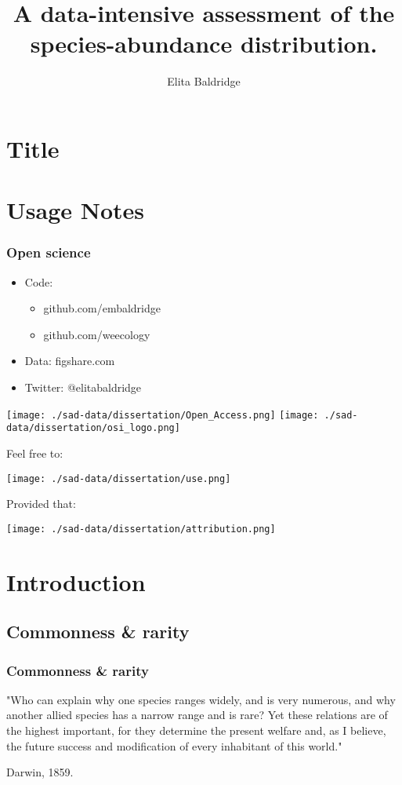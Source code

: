 \documentclass[14pt]{beamer}
\author{Elita Baldridge}
\title[17pt]{A data-intensive assessment of the species-abundance distribution.}
\date{}
\institute{\texttt{[image: ../Miscellaneous/Pictures/ecology\_center\_horizontal.jpg]}\texttt{[image: ./sad-data/dissertation/WeecologyProduction.png]}}
\begin{document}
\section{Title}
\begin{frame}[t]
\titlepage
\end{frame}

\section{Usage Notes}
\begin{frame}
\frametitle{Open science}
\begin{itemize}
\item Code: 
\begin{itemize}
\item github.com/embaldridge
\item github.com/weecology
\end{itemize}
\item Data: figshare.com
\item Twitter: @elitabaldridge
\end{itemize}
\texttt{[image: ./sad-data/dissertation/Open\_Access.png]}  
\texttt{[image: ./sad-data/dissertation/osi\_logo.png]}
\end{frame}

\begin{frame}[t]
\begin{huge}
Feel free to:\\
\end{huge}
\texttt{[image: ./sad-data/dissertation/use.png]}\\
\begin{huge}
Provided that:\\
\end{huge}
\texttt{[image: ./sad-data/dissertation/attribution.png]}
\end{frame}

\section{Introduction}
\subsection{Commonness & rarity}
\begin{frame}[t]
\frametitle{Commonness \& rarity}
"Who can explain why one species ranges widely, and is very numerous, and why another allied species has a narrow range and is rare?  Yet these relations are of the highest important, for they determine the present welfare and, as I believe, the future success and modification of every inhabitant of this world."  


Darwin, 1859.

\end{frame}
\end{document}
